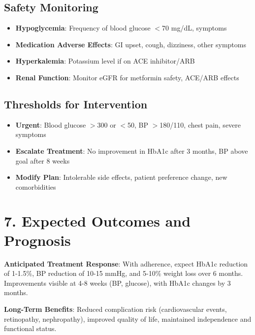 \documentclass[11pt,letterpaper]{article}
\begin{document}
\subsection*{Safety Monitoring}

\begin{itemize}[leftmargin=*]
    \item \textbf{Hypoglycemia}: Frequency of blood glucose $<$70 mg/dL, symptoms
    \item \textbf{Medication Adverse Effects}: GI upset, cough, dizziness, other symptoms
    \item \textbf{Hyperkalemia}: Potassium level if on ACE inhibitor/ARB
    \item \textbf{Renal Function}: Monitor eGFR for metformin safety, ACE/ARB effects
\end{itemize}

\subsection*{Thresholds for Intervention}

\begin{itemize}[leftmargin=*]
    \item \textbf{Urgent}: Blood glucose $>$300 or $<$50, BP $>$180/110, chest pain, severe symptoms
    \item \textbf{Escalate Treatment}: No improvement in HbA1c after 3 months, BP above goal after 8 weeks
    \item \textbf{Modify Plan}: Intolerable side effects, patient preference change, new comorbidities
\end{itemize}

\section*{7. Expected Outcomes and Prognosis}

\textbf{Anticipated Treatment Response}: With adherence, expect HbA1c reduction of 1-1.5\%, BP reduction of 10-15 mmHg, and 5-10\% weight loss over 6 months. Improvements visible at 4-8 weeks (BP, glucose), with HbA1c changes by 3 months.

\vspace{0.5em}
\textbf{Long-Term Benefits}: Reduced complication risk (cardiovascular events, retinopathy, nephropathy), improved quality of life, maintained independence and functional status.

\end{document}
